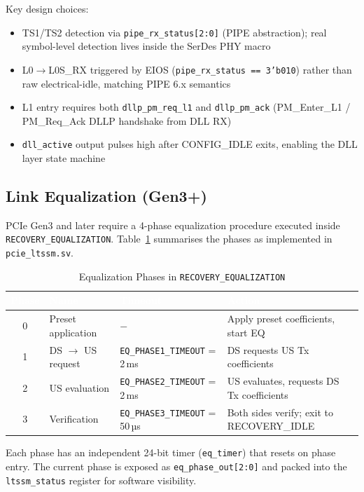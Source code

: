 \documentclass[12pt,a4paper]{report}
\newcommand{\theadcell}[1]{%
  \cellcolor{tablehead}\textcolor{white}{\textbf{#1}}}
\begin{document}
Key design choices:
\begin{itemize}[noitemsep]
  \item TS1/TS2 detection via \texttt{pipe\_rx\_status[2:0]} (PIPE abstraction);
    real symbol-level detection lives inside the SerDes PHY macro
  \item L0$\to$L0S\_RX triggered by EIOS (\texttt{pipe\_rx\_status == 3'b010})
    rather than raw electrical-idle, matching PIPE 6.x semantics
  \item L1 entry requires both \texttt{dllp\_pm\_req\_l1} and \texttt{dllp\_pm\_ack}
    (PM\_Enter\_L1 / PM\_Req\_Ack DLLP handshake from DLL RX)
  \item \texttt{dll\_active} output pulses high after CONFIG\_IDLE exits,
    enabling the DLL layer state machine
\end{itemize}

\subsection{Link Equalization (Gen3+)}\label{sec:eq}

PCIe Gen3 and later require a 4-phase equalization procedure executed inside
\texttt{RECOVERY\_EQUALIZATION}. Table~\ref{tab:eqphase} summarises the phases
as implemented in \texttt{pcie\_ltssm.sv}.

\begin{table}[H]
\centering
\caption{Equalization Phases in \texttt{RECOVERY\_EQUALIZATION}}
\label{tab:eqphase}
\begin{tabular}{clll}
  \toprule
  \theadcell{Phase} & \theadcell{Name} & \theadcell{Timeout} & \theadcell{Action} \\
  \midrule
  0 & Preset application & $-$ & Apply preset coefficients, start EQ \\
  1 & DS $\to$ US request & \texttt{EQ\_PHASE1\_TIMEOUT} = 2\,ms & DS requests US Tx coefficients \\
  2 & US evaluation      & \texttt{EQ\_PHASE2\_TIMEOUT} = 2\,ms & US evaluates, requests DS Tx coefficients \\
  3 & Verification       & \texttt{EQ\_PHASE3\_TIMEOUT} = 50\,µs & Both sides verify; exit to RECOVERY\_IDLE \\
  \bottomrule
\end{tabular}
\end{table}

Each phase has an independent 24-bit timer (\texttt{eq\_timer}) that resets on
phase entry. The current phase is exposed as \texttt{eq\_phase\_out[2:0]} and
packed into the \texttt{ltssm\_status} register for software visibility.
\end{document}

